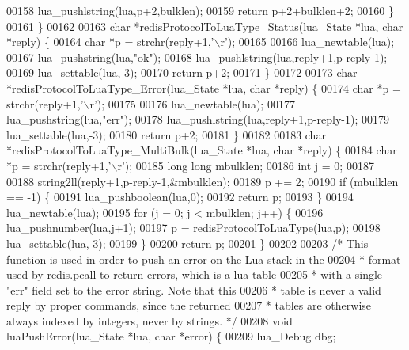 \begin{DoxyCode}
00158         lua\_pushlstring(lua,p+2,bulklen);
00159         \textcolor{keywordflow}{return} p+2+bulklen+2;
00160     \}
00161 \}
00162 
00163 \textcolor{keywordtype}{char} *redisProtocolToLuaType\_Status(lua\_State *lua, \textcolor{keywordtype}{char} *reply) \{
00164     \textcolor{keywordtype}{char} *p = strchr(reply+1,\textcolor{stringliteral}{'\(\backslash\)r'});
00165 
00166     lua\_newtable(lua);
00167     lua\_pushstring(lua,\textcolor{stringliteral}{"ok"});
00168     lua\_pushlstring(lua,reply+1,p-reply-1);
00169     lua\_settable(lua,-3);
00170     \textcolor{keywordflow}{return} p+2;
00171 \}
00172 
00173 \textcolor{keywordtype}{char} *redisProtocolToLuaType\_Error(lua\_State *lua, \textcolor{keywordtype}{char} *reply) \{
00174     \textcolor{keywordtype}{char} *p = strchr(reply+1,\textcolor{stringliteral}{'\(\backslash\)r'});
00175 
00176     lua\_newtable(lua);
00177     lua\_pushstring(lua,\textcolor{stringliteral}{"err"});
00178     lua\_pushlstring(lua,reply+1,p-reply-1);
00179     lua\_settable(lua,-3);
00180     \textcolor{keywordflow}{return} p+2;
00181 \}
00182 
00183 \textcolor{keywordtype}{char} *redisProtocolToLuaType\_MultiBulk(lua\_State *lua, \textcolor{keywordtype}{char} *reply) \{
00184     \textcolor{keywordtype}{char} *p = strchr(reply+1,\textcolor{stringliteral}{'\(\backslash\)r'});
00185     \textcolor{keywordtype}{long} \textcolor{keywordtype}{long} mbulklen;
00186     \textcolor{keywordtype}{int} j = 0;
00187 
00188     string2ll(reply+1,p-reply-1,&mbulklen);
00189     p += 2;
00190     \textcolor{keywordflow}{if} (mbulklen == -1) \{
00191         lua\_pushboolean(lua,0);
00192         \textcolor{keywordflow}{return} p;
00193     \}
00194     lua\_newtable(lua);
00195     \textcolor{keywordflow}{for} (j = 0; j < mbulklen; j++) \{
00196         lua\_pushnumber(lua,j+1);
00197         p = redisProtocolToLuaType(lua,p);
00198         lua\_settable(lua,-3);
00199     \}
00200     \textcolor{keywordflow}{return} p;
00201 \}
00202 
00203 \textcolor{comment}{/* This function is used in order to push an error on the Lua stack in the}
00204 \textcolor{comment}{ * format used by redis.pcall to return errors, which is a lua table}
00205 \textcolor{comment}{ * with a single "err" field set to the error string. Note that this}
00206 \textcolor{comment}{ * table is never a valid reply by proper commands, since the returned}
00207 \textcolor{comment}{ * tables are otherwise always indexed by integers, never by strings. */}
00208 \textcolor{keywordtype}{void} luaPushError(lua\_State *lua, \textcolor{keywordtype}{char} *error) \{
00209     lua\_Debug dbg;

\end{DoxyCode}
